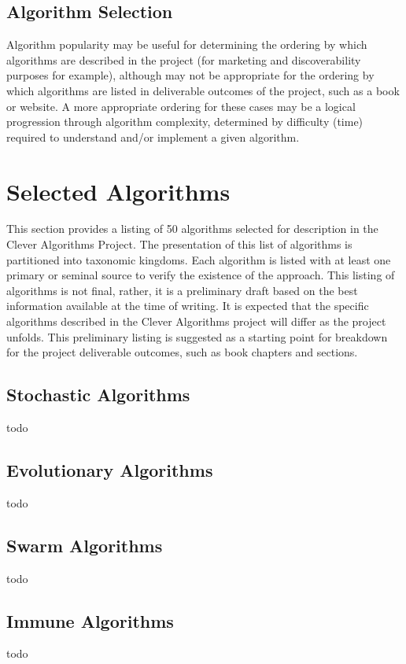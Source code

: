 \documentclass[a4paper, 11pt]{article}
\begin{document}
\subsection{Algorithm Selection}
Algorithm popularity may be useful for determining the ordering by which algorithms are described in the project (for marketing and discoverability purposes for example), although may not be appropriate for the ordering by which algorithms are listed in deliverable outcomes of the project, such as a book or website. A more appropriate ordering for these cases may be a logical progression through algorithm complexity, determined by difficulty (time) required to understand and/or implement a given algorithm.  

% 
% 
\section{Selected Algorithms}
\label{sec:selection}
This section provides a listing of 50 algorithms selected for description in the Clever Algorithms Project. The presentation of this list of algorithms is partitioned into taxonomic kingdoms. Each algorithm is listed with at least one primary or seminal source to verify the existence of the approach. This listing of algorithms is not final, rather, it is a preliminary draft based on the best information available at the time of writing. It is expected that the specific algorithms described in the Clever Algorithms project will differ as the project unfolds. This preliminary listing is suggested as a starting point for breakdown for the project deliverable outcomes, such as book chapters and sections.

\subsection{Stochastic Algorithms}
todo

\subsection{Evolutionary Algorithms}
todo

\subsection{Swarm Algorithms}
todo

\subsection{Immune Algorithms}
todo
\end{document}
